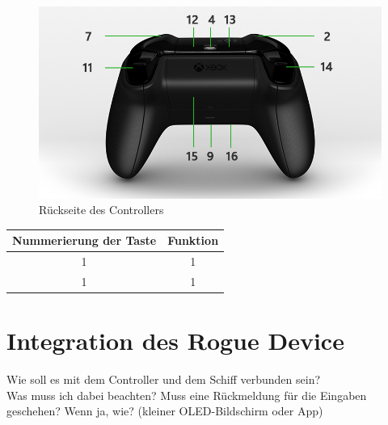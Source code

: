 \begin{figure}[H]
    \centering
    \includegraphics[scale=0.5]{images/rueckseite.jpg}
    \caption{Rückseite des Controllers}
    \label{fig:rueckseite}
\end{figure}

\begin{table}[H]
    \begin{tabular}{|c|c|}
    \hline
    \rowcolor[gray]{0.8}
     Nummerierung der Taste & Funktion \\ \hline 
     1& 1 \\ \hline 
     1& 1 \\ \hline 
    \end{tabular}
\end{table}

\section{Integration des Rogue Device}
Wie soll es mit dem Controller und dem Schiff verbunden sein?
\\
Was muss ich dabei beachten?
Muss eine Rückmeldung für die Eingaben geschehen? Wenn ja, wie?
(kleiner OLED-Bildschirm oder App)
